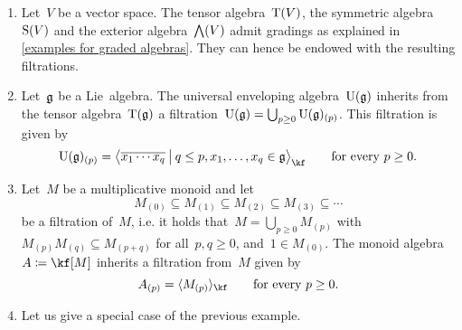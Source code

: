 \begin{examples}
	\label{examples for filtered algebras}
	\leavevmode
	\begin{enumerate}
		\item
			Let~$V$ be a vector space.
			The tensor algebra~$\operatorname{T}(V)$, the symmetric algebra~$\operatorname{S}(V)$ and the exterior algebra~$\operatorname{\bigwedge}(V)$ admit gradings as explained in \cref{examples for graded algebras}.
			They can hence be endowed with the resulting filtrations.
		\item
			Let~$\mathfrak{g}$ be a Lie~algebra.
			The universal enveloping algebra~$\operatorname{U}(\mathfrak{g})$ inherits from the tensor algebra~$\operatorname{T}(\mathfrak{g})$ a filtration~$\operatorname{U}(\mathfrak{g}) = \bigcup_{p \geq 0} \operatorname{U}(\mathfrak{g})_{(p)}$.
			This filtration is given by
			\[
				\Univ(\glie)_{(p)}
				=
				\gen[\big]{
					\class{x_1 \dotsm x_q}
				\suchthat[\big]
					q \leq p,
					x_1, \dotsc, x_q \in \glie
				}_{\kf}
				\qquad
				\text{for every~$p \geq 0$.}
			\]
		\item
			Let~$M$ be a multiplicative monoid and let
			\[
				M_{(0)}
				\subseteq
				M_{(1)}
				\subseteq
				M_{(2)}
				\subseteq
				M_{(3)}
				\subseteq
				\dotsb
			\]
			be a filtration of~$M$, i.e. it holds that~$M = \bigcup_{p \geq 0} M_{(p)}$ with~$M_{(p)} M_{(q)} \subseteq M_{(p+q)}$ for all~$p, q \geq 0$, and~$1 \in M_{(0)}$.
			The monoid algebra~$A \defined \kf[M]$ inherits a filtration from~$M$ given by
			\[
				A_{(p)}
				=
				\gen{ M_{(p)} }_{\kf}
				\qquad
				\text{for every~$p \geq 0$.}
			\]
		\item
			Let us give a special case of the previous example.


\end{enumerate}
\end{examples}
